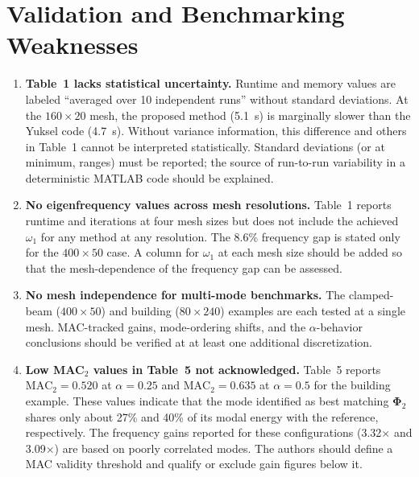 \documentclass[11pt,a4paper]{article}
\begin{document}
\section{Validation and Benchmarking Weaknesses}

\begin{enumerate}[leftmargin=*, label=\textbf{V\arabic*.}]

\item \textbf{Table~1 lacks statistical uncertainty.}
Runtime and memory values are labeled ``averaged over 10 independent
runs'' without standard deviations. At the $160\times20$ mesh, the
proposed method (5.1~s) is marginally slower than the Yuksel code
(4.7~s). Without variance information, this difference and others in
Table~1 cannot be interpreted statistically. Standard deviations (or
at minimum, ranges) must be reported; the source of run-to-run
variability in a deterministic MATLAB code should be explained.

\item \textbf{No eigenfrequency values across mesh resolutions.}
Table~1 reports runtime and iterations at four mesh sizes but does not
include the achieved $\omega_1$ for any method at any resolution.
The 8.6\% frequency gap is stated only for the $400\times50$ case.
A column for $\omega_1$ at each mesh size should be added so that the
mesh-dependence of the frequency gap can be assessed.

\item \textbf{No mesh independence for multi-mode benchmarks.}
The clamped-beam ($400\times50$) and building ($80\times240$) examples
are each tested at a single mesh. MAC-tracked gains, mode-ordering
shifts, and the $\alpha$-behavior conclusions should be verified at
at least one additional discretization.

\item \textbf{Low MAC$_2$ values in Table~5 not acknowledged.}
Table~5 reports $\mathrm{MAC}_2=0.520$ at $\alpha=0.25$ and
$\mathrm{MAC}_2=0.635$ at $\alpha=0.5$ for the building example.
These values indicate that the mode identified as best matching
$\boldsymbol{\Phi}_2$ shares only about 27\% and 40\% of its modal
energy with the reference, respectively. The frequency gains reported
for these configurations (3.32$\times$ and 3.09$\times$) are based on
poorly correlated modes. The authors should define a MAC validity
threshold and qualify or exclude gain figures below it.


\end{enumerate}
\end{document}
